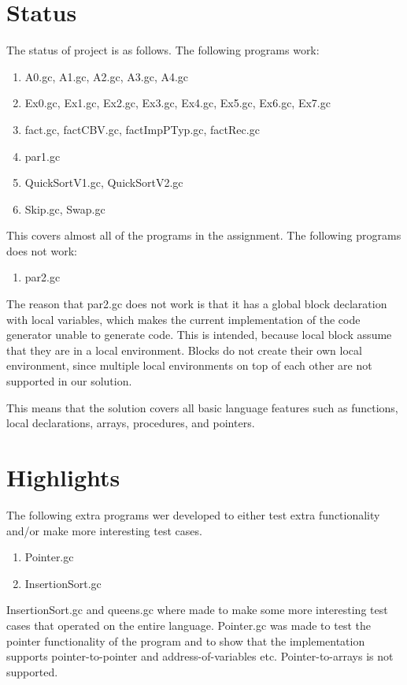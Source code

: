 \documentclass[12pt]{article}
\begin{document}
\clearpage\maketitle
\thispagestyle{empty}


\section{Status}
The status of project is as follows. The following programs work:
\begin{enumerate}
\item A0.gc, A1.gc, A2.gc, A3.gc, A4.gc 
\item Ex0.gc, Ex1.gc, Ex2.gc, Ex3.gc, Ex4.gc, Ex5.gc, Ex6.gc, Ex7.gc
\item fact.gc, factCBV.gc, factImpPTyp.gc, factRec.gc
\item par1.gc
\item QuickSortV1.gc, QuickSortV2.gc
\item Skip.gc, Swap.gc
\end{enumerate}
This covers almost all of the programs in the assignment. The following programs does not work:
\begin{enumerate}
\item par2.gc
\end{enumerate}
The reason that par2.gc does not work is that it has a global block declaration with local variables, which makes the current implementation of the code generator unable to generate code. This is intended, because local block assume that they are in a local environment. Blocks do not create their own local environment, since multiple local environments on top of each other are not supported in our solution.

This means that the solution covers all basic language features such as functions, local declarations, arrays, procedures, and pointers. 

\section{Highlights}
The following extra programs wer developed to either test extra functionality and/or make more interesting test cases. 
\begin{enumerate}
\item Pointer.gc
\item InsertionSort.gc
\end{enumerate}
InsertionSort.gc and queens.gc where made to make some more interesting test cases that operated on the entire language. Pointer.gc was made to test the pointer functionality of the program and to show that the implementation supports pointer-to-pointer and address-of-variables etc. Pointer-to-arrays is not supported.
\end{document}
